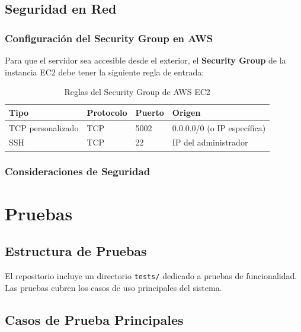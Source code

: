 \documentclass[12pt,a4paper]{report}
\begin{document}
\section{Seguridad en Red}

\subsection{Configuración del Security Group en AWS}

Para que el servidor sea accesible desde el exterior, el \textbf{Security Group} de la instancia EC2 debe tener la siguiente regla de entrada:

\begin{table}[H]
  \centering
  \begin{tabular}{llll}
    \toprule
    \textbf{Tipo} & \textbf{Protocolo} & \textbf{Puerto} & \textbf{Origen} \\
    \midrule
    TCP personalizado & TCP & 5002 & 0.0.0.0/0 (o IP específica) \\
    SSH & TCP & 22 & IP del administrador \\
    \bottomrule
  \end{tabular}
  \caption{Reglas del Security Group de AWS EC2}
\end{table}

\subsection{Consideraciones de Seguridad}



\chapter{Pruebas}

\section{Estructura de Pruebas}

El repositorio incluye un directorio \texttt{tests/} dedicado a pruebas de funcionalidad. Las pruebas cubren los casos de uso principales del sistema.

\section{Casos de Prueba Principales}
\end{document}

